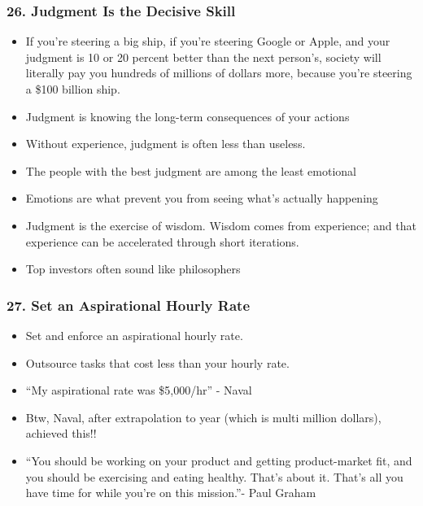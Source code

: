 \begin{frame}[fragile]
\frametitle{26. Judgment Is the Decisive Skill}
\begin{itemize}
\item If you're steering a big ship, if you're steering Google or Apple, and your judgment is 10 or 20 percent better than the next person's, society will literally pay you hundreds of millions of dollars more, because you're steering a \$100 billion ship.
\item Judgment is knowing the long-term consequences of your actions
\item Without experience, judgment is often less than useless.
\item The people with the best judgment are among the least emotional
\item Emotions are what prevent you from seeing what's actually happening
\item Judgment is the exercise of wisdom. Wisdom comes from experience; and that experience can be accelerated through short iterations.
\item Top investors often sound like philosophers
\end{itemize}
\end{frame}

\begin{frame}[fragile]
\frametitle{27. Set an Aspirational Hourly Rate}
\begin{itemize}
\item Set and enforce an aspirational hourly rate.
\item Outsource tasks that cost less than your hourly rate.
\item ``My aspirational rate was \$5,000/hr'' - Naval
\item Btw, Naval, after extrapolation to year (which is multi million dollars), achieved this!!
\item ``You should be working on your product and
getting product-market fit, and you should be exercising and eating healthy. That's about it. That's all you have time for while you're on this mission.''- Paul Graham
\end{itemize}
\end{frame}

